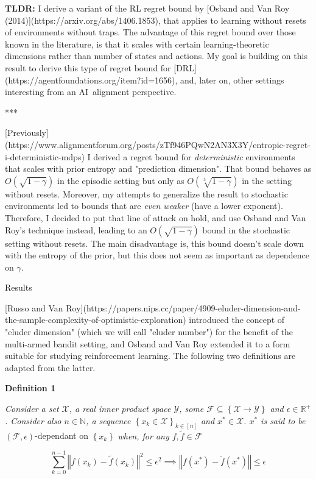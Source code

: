 \documentclass[a4paper]{article}
\newcommand{\Co}[1]{}
\newcommand{\AP}[1]{\left(#1\right)}
\newcommand{\AC}[1]{\left\{#1\right\}}
\newcommand{\Nats}{\mathbb{N}}
\newcommand{\Reals}{\mathbb{R}}
\newcommand{\Norm}[1]{\left\Vert #1 \right\Vert}
\newcommand{\X}{\mathcal{X}}
\newcommand{\Y}{\mathcal{Y}}
\newcommand{\F}{\mathcal{F}}
\begin{document}
\textbf{TLDR:}\Co{b} I derive a variant of the RL regret bound by [Osband and Van Roy (2014)](https://arxiv.org/abs/1406.1853), that applies to learning without resets of environments without traps. The advantage of this regret bound over those known in the literature, is that it scales with certain learning-theoretic dimensions rather than number of states and actions. My goal is building on this result to derive this type of regret bound for [DRL](https://agentfoundations.org/item?id=1656), and, later on, other settings interesting from an AI\ alignment perspective.

***

[Previously](https://www.alignmentforum.org/posts/zTf946PQwN2AN3X3Y/entropic-regret-i-deterministic-mdps) I derived a regret bound for \textit{deterministic}\Co{i} environments that scales with prior entropy and "prediction dimension". That bound behaves as $O\AP{\sqrt{1-\gamma}}$ in the episodic setting but only as $O\AP{\sqrt[3]{1-\gamma}}$ in the setting without resets. Moreover, my attempts to generalize the result to stochastic environments led to bounds that are \textit{even weaker}\Co{i} (have a lower exponent). Therefore, I decided to put that line of attack on hold, and use Osband and Van Roy's technique instead, leading to an $O\AP{\sqrt{1-\gamma}}$ bound in the stochastic setting without resets. The main disadvantage is, this bound doesn't scale down with the entropy of the prior, but this does not seem as important as dependence on $\gamma$.

\begin{Huge}Results\end{Huge}

[Russo and Van Roy](https://papers.nips.cc/paper/4909-eluder-dimension-and-the-sample-complexity-of-optimistic-exploration) introduced the concept of "eluder dimension" (which we will call "eluder number") for the benefit of the multi-armed bandit setting, and Osband and Van Roy extended it to a form suitable for studying reinforcement learning. The following two definitions are adapted from the latter.

\textbf{Definition 1}\Co{b}

\textit{Consider a set $\X$, a real inner product space $\Y$, some $\F\subseteq\AC{\X\rightarrow\Y}$ and $\epsilon\in\Reals^+$. Consider also $n\in\Nats$, a sequence $\AC{x_k\in\X}_{k\in[n]}$ and $x^*\in\X$. $x^*$ is said to be} $\AP{\F,\epsilon}$-dependant on $\AC{x_k}$ \textit{when, for any $f,\tilde{f}\in\F$}\Co{i}

$$\sum_{k=0}^{n-1}\Norm{f\AP{x_k}-\tilde{f}\AP{x_k}}^2 \leq \epsilon^2 \implies \Norm{f\AP{x^*}-\tilde{f}\AP{x^*}}\leq\epsilon$$
\end{document}
